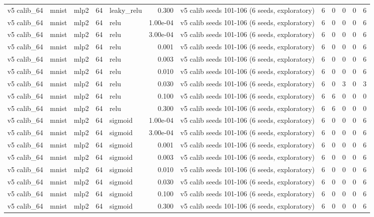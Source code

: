 \begin{table}[htbp]
{\begin{tabular}{@{}lllrlrlrrrrr@{}}
v5 calib\_64 & mnist & mlp2 & 64 & leaky\_relu & 0.300 & v5 calib seeds 101-106 (6 seeds, exploratory) & 6 & 0 & 0 & 0 & 6 \\
v5 calib\_64 & mnist & mlp2 & 64 & relu & 1.00e-04 & v5 calib seeds 101-106 (6 seeds, exploratory) & 6 & 0 & 0 & 0 & 6 \\
v5 calib\_64 & mnist & mlp2 & 64 & relu & 3.00e-04 & v5 calib seeds 101-106 (6 seeds, exploratory) & 6 & 0 & 0 & 0 & 6 \\
v5 calib\_64 & mnist & mlp2 & 64 & relu & 0.001 & v5 calib seeds 101-106 (6 seeds, exploratory) & 6 & 0 & 0 & 0 & 6 \\
v5 calib\_64 & mnist & mlp2 & 64 & relu & 0.003 & v5 calib seeds 101-106 (6 seeds, exploratory) & 6 & 0 & 0 & 0 & 6 \\
v5 calib\_64 & mnist & mlp2 & 64 & relu & 0.010 & v5 calib seeds 101-106 (6 seeds, exploratory) & 6 & 0 & 0 & 0 & 6 \\
v5 calib\_64 & mnist & mlp2 & 64 & relu & 0.030 & v5 calib seeds 101-106 (6 seeds, exploratory) & 6 & 0 & 3 & 0 & 3 \\
v5 calib\_64 & mnist & mlp2 & 64 & relu & 0.100 & v5 calib seeds 101-106 (6 seeds, exploratory) & 6 & 6 & 0 & 0 & 0 \\
v5 calib\_64 & mnist & mlp2 & 64 & relu & 0.300 & v5 calib seeds 101-106 (6 seeds, exploratory) & 6 & 6 & 0 & 0 & 0 \\
v5 calib\_64 & mnist & mlp2 & 64 & sigmoid & 1.00e-04 & v5 calib seeds 101-106 (6 seeds, exploratory) & 6 & 0 & 0 & 0 & 6 \\
v5 calib\_64 & mnist & mlp2 & 64 & sigmoid & 3.00e-04 & v5 calib seeds 101-106 (6 seeds, exploratory) & 6 & 0 & 0 & 0 & 6 \\
v5 calib\_64 & mnist & mlp2 & 64 & sigmoid & 0.001 & v5 calib seeds 101-106 (6 seeds, exploratory) & 6 & 0 & 0 & 0 & 6 \\
v5 calib\_64 & mnist & mlp2 & 64 & sigmoid & 0.003 & v5 calib seeds 101-106 (6 seeds, exploratory) & 6 & 0 & 0 & 0 & 6 \\
v5 calib\_64 & mnist & mlp2 & 64 & sigmoid & 0.010 & v5 calib seeds 101-106 (6 seeds, exploratory) & 6 & 0 & 0 & 0 & 6 \\
v5 calib\_64 & mnist & mlp2 & 64 & sigmoid & 0.030 & v5 calib seeds 101-106 (6 seeds, exploratory) & 6 & 0 & 0 & 0 & 6 \\
v5 calib\_64 & mnist & mlp2 & 64 & sigmoid & 0.100 & v5 calib seeds 101-106 (6 seeds, exploratory) & 6 & 0 & 0 & 0 & 6 \\
v5 calib\_64 & mnist & mlp2 & 64 & sigmoid & 0.300 & v5 calib seeds 101-106 (6 seeds, exploratory) & 6 & 0 & 0 & 0 & 6 \\

\end{tabular}}
\end{table}
